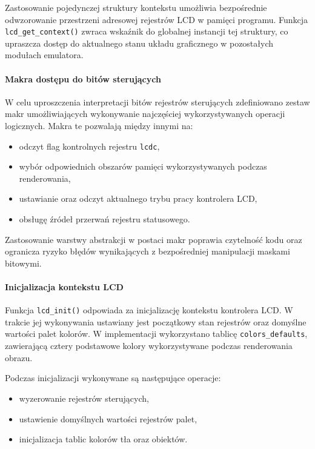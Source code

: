 \documentclass{article}
\begin{document}
Zastosowanie pojedynczej struktury kontekstu umożliwia bezpośrednie odwzorowanie przestrzeni adresowej rejestrów LCD w pamięci programu. Funkcja \texttt{lcd\_get\_context()} zwraca wskaźnik do globalnej instancji tej struktury, co upraszcza dostęp do aktualnego stanu układu graficznego w pozostałych modułach emulatora.

\paragraph{Makra dostępu do bitów sterujących}

W celu uproszczenia interpretacji bitów rejestrów sterujących zdefiniowano zestaw makr umożliwiających wykonywanie najczęściej wykorzystywanych operacji logicznych. Makra te pozwalają między innymi na:

\begin{itemize}
	\item odczyt flag kontrolnych rejestru \texttt{lcdc},
	\item wybór odpowiednich obszarów pamięci wykorzystywanych podczas renderowania,
	\item ustawianie oraz odczyt aktualnego trybu pracy kontrolera LCD,
	\item obsługę źródeł przerwań rejestru statusowego.
\end{itemize}

Zastosowanie warstwy abstrakcji w postaci makr poprawia czytelność kodu oraz ogranicza ryzyko błędów wynikających z bezpośredniej manipulacji maskami bitowymi.

\paragraph{Inicjalizacja kontekstu LCD}

Funkcja \texttt{lcd\_init()} odpowiada za inicjalizację kontekstu kontrolera LCD. W trakcie jej wykonywania ustawiany jest początkowy stan rejestrów oraz domyślne wartości palet kolorów. W implementacji wykorzystano tablicę \texttt{colors\_defaults}, zawierającą cztery podstawowe kolory wykorzystywane podczas renderowania obrazu.

Podczas inicjalizacji wykonywane są następujące operacje:

\begin{itemize}
	\item wyzerowanie rejestrów sterujących,
	\item ustawienie domyślnych wartości rejestrów palet,
	\item inicjalizacja tablic kolorów tła oraz obiektów.
\end{itemize}
\end{document}
